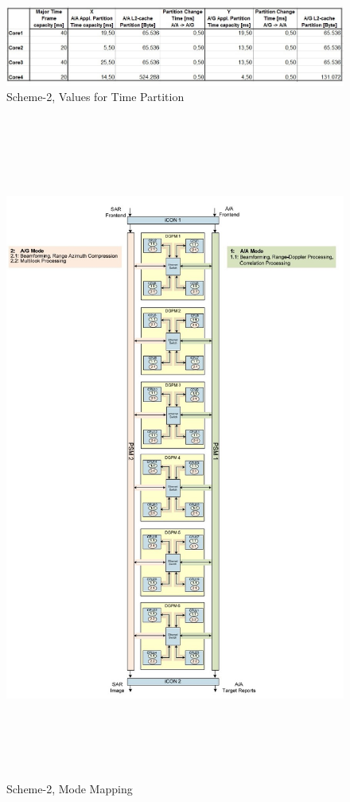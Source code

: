 \begin{figure}[h!]
	\centering
	\includegraphics[width=150mm]{figures/scheme2_partition_values}
	\caption{Scheme-2, Values for Time Partition}
	\label{fig:existing_analysis:scheme2_partition_values}
\end{figure}

\begin{figure}[h!]
	\centering
	\includegraphics[width=160mm, height=220mm]{figures/scheme2_mode_mapping}
	\caption{Scheme-2, Mode Mapping}
	\label{fig:existing_analysis:scheme2_mode_mapping}
\end{figure}
\clearpage

